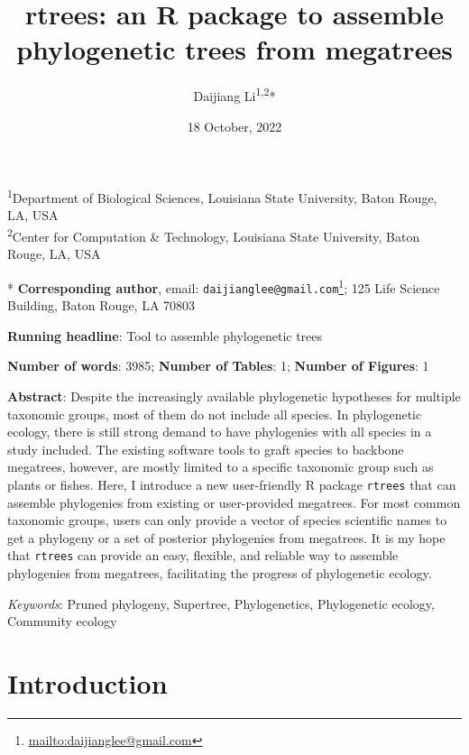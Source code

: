 \documentclass[
  12pt,
]{article}
\title{rtrees: an R package to assemble phylogenetic trees from megatrees}
\author{Daijiang Li\textsuperscript{1,2}*}
\date{18 October, 2022}
\DeclareRobustCommand{\href}[2]{#2\footnote{\url{#1}}}
\begin{document}
\maketitle

\renewcommand{\figurename}{{\textbf{Figure}}}
\renewcommand{\tablename}{{\textbf{Table}}}

\footnotesize

\textsuperscript{1}Department of Biological Sciences, Louisiana State University, Baton Rouge, LA, USA\\
\textsuperscript{2}Center for Computation \& Technology, Louisiana State University, Baton Rouge, LA, USA

* \textbf{Corresponding author}, email: \href{mailto:daijianglee@gmail.com}{\nolinkurl{daijianglee@gmail.com}}; 125 Life Science Building, Baton Rouge, LA 70803

\normalsize

\textbf{Running headline}: Tool to assemble phylogenetic trees

\textbf{Number of words}: 3985; \textbf{Number of Tables}: 1; \textbf{Number of Figures}: 1

\textbf{Abstract}: Despite the increasingly available phylogenetic hypotheses for multiple taxonomic groups, most of them do not include all species. In phylogenetic ecology, there is still strong demand to have phylogenies with all species in a study included. The existing software tools to graft species to backbone megatrees, however, are mostly limited to a specific taxonomic group such as plants or fishes. Here, I introduce a new user-friendly R package \texttt{rtrees} that can assemble phylogenies from existing or user-provided megatrees. For most common taxonomic groups, users can only provide a vector of species scientific names to get a phylogeny or a set of posterior phylogenies from megatrees. It is my hope that \texttt{rtrees} can provide an easy, flexible, and reliable way to assemble phylogenies from megatrees, facilitating the progress of phylogenetic ecology.

\emph{Keywords}: Pruned phylogeny, Supertree, Phylogenetics, Phylogenetic ecology, Community ecology

\clearpage

\hypertarget{introduction}{%
\section{Introduction}\label{introduction}}
\end{document}
